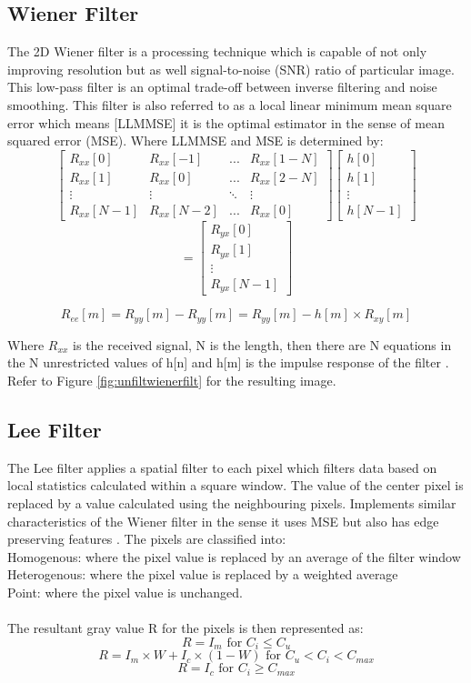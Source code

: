 \documentclass{article}
\begin{document}
	\subsection{\label{sec:level2} Wiener Filter}
	The 2D Wiener filter is a processing technique which is capable of not only improving resolution but as well signal-to-noise (SNR) ratio of particular image. This low-pass filter is an optimal trade-off between inverse filtering and noise smoothing. This filter is also referred to as a local linear minimum mean square error which means [LLMMSE] it is the optimal estimator in the sense of mean squared error (MSE). Where LLMMSE and MSE is determined by:
$$
\begin{bmatrix}
R_{xx}[0] & R_{xx}[-1] & ... & R_{xx}[1-N]\\
R_{xx}[1] & R_{xx}[0] & ... & R_{xx}[2-N]\\
\vdots & \vdots & \ddots & \vdots \\
R_{xx}[N-1] & R_{xx}[N-2] & ... & R_{xx}[0]
\end{bmatrix}
\begin{bmatrix}
h[0]\\
h[1]\\
\vdots\\
h[N-1]
\end{bmatrix}
$$
$$
=
\begin{bmatrix}
R_{yx}[0]\\
R_{yx}[1]\\
\vdots\\
R_{yx}[N-1]
\end{bmatrix}
$$

$$R_{ee}[m]=R_{yy}[m]-R_{yy}[m] = R_{yy}[m]-h[m] \times R_{xy}[m]$$

Where $R_{xx}$ is the received signal, N is the length, then there are N equations in the N unrestricted values of h[n] and h[m] is the impulse response of the filter \cite{Oppenheim_2015}. Refer to Figure \ref{fig:unfiltwienerfilt} for the resulting image.


\subsection{\label{sec:level2} Lee Filter}
The Lee filter applies a spatial filter to each pixel which filters data based on local statistics calculated within a square window. The value of the center pixel is replaced by a value calculated using the neighbouring pixels. Implements similar characteristics of the Wiener filter in the sense it uses MSE but also has edge preserving features \cite{leefilter}. The pixels are classified into:
\\
Homogenous: where the pixel value is replaced by an average of the filter window
\\
Heterogenous: where the pixel value is replaced by a weighted average
\\
Point: where the pixel value is unchanged.
\\
\\
The resultant gray value R for the pixels is then represented as:
$$R = I_{m} \text{ for } C_{i} \leq C_{u}$$
$$R = I_{m} \times W+I_{c} \times (1-W) \text{ for } C_{u}<C_{i}<C_{max}$$
$$R = I_{c} \text{ for } C_{i} \geq C_{max}$$
\end{document}
